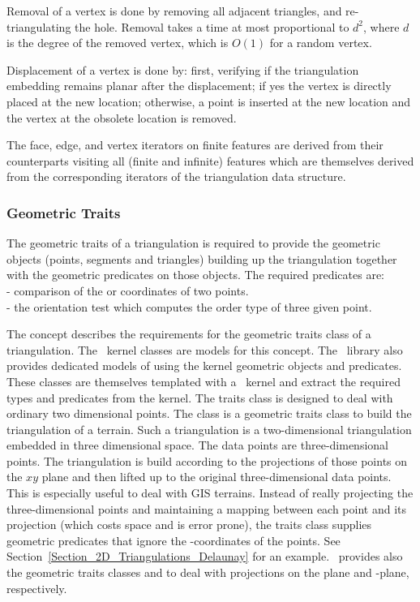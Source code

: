 Removal of a vertex is done by removing all adjacent triangles, and
re-triangulating the hole. Removal takes a time  at most proportional to
$d^2$, where
$d$ is the degree of the removed vertex,
which is $O(1)$ for a random vertex.

Displacement of a vertex is done by: first, verifying if the triangulation embedding
remains planar after the displacement; if yes the vertex is directly placed at the new location; otherwise, a point is inserted at the new location 
and the vertex at the obsolete location is removed.

The face, edge, and vertex iterators on finite features
are derived from their counterparts visiting all (finite and infinite)
features which are themselves derived from the corresponding iterators
of the triangulation data structure.


\subsubsection{Geometric Traits\label{Subsubsection_2D_Triangulation_Basic_Geometric_Traits}}

The geometric traits of a triangulation 
 is required to provide
the geometric objects (points, segments and triangles)
building up the triangulation
together with the geometric predicates on those objects.
The required predicates are: \\
- comparison of the  or  coordinates of two points.\\
- the orientation test which computes 
  the order type of three given point.

The concept
  describes the requirements for the 
geometric traits class of a triangulation.
 The \cgal\  kernel classes 
are models for  this  concept.
The \cgal\  library also provides dedicated models
of  
using the kernel geometric objects and predicates.
These classes are themselves templated with a \cgal\  kernel
and extract the required types and predicates from the kernel.
The traits class 
is designed to deal with ordinary  two dimensional points.
The class  
is a geometric traits class to build the triangulation
of a terrain. Such a triangulation is a two-dimensional
triangulation embedded  in  three dimensional space.
The data points are three-dimensional points.
The triangulation is 
build according to  the projections of those points
on the $xy$ plane  and then lifted up to the original
three-dimensional data points.
This is especially useful
to deal with GIS terrains.
Instead of really projecting the  three-dimensional points and
maintaining a mapping between each point and its projection
 (which costs space and is error prone),
the traits class  supplies geometric predicates that ignore the
-coordinates of the points.
See Section~\ref{Section_2D_Triangulations_Delaunay} for an example.
\cgal\ provides also the geometric traits classes
 and
 to
deal with projections on the
  plane  and  -plane,
respectively.


